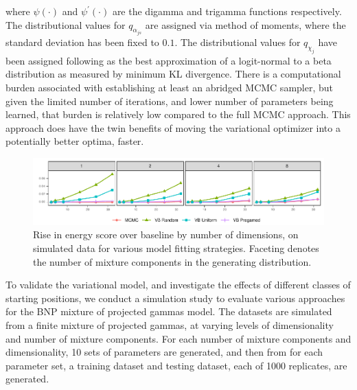     where $\psi(\cdot)$ and $\psi^{\prime}(\cdot)$ are the digamma and trigamma functions
    respectively.  The distributional values for $q_{\alpha_{js}}$ are assigned via method
    of moments, where the standard deviation has been fixed to $0.1$.  The distributional
    values for $q_{\chi_j}$ have been assigned following \cite{aitchison1980} as the best
    approximation of a logit-normal to a beta distribution as measured by minimum KL 
    divergence.  There is a computational burden associated with establishing at least an
    abridged MCMC sampler, but given the limited number of iterations, and lower number of
    parameters being learned, that burden is relatively low compared to the full MCMC approach.
    This approach does have the twin benefits of moving the variational optimizer into a 
    potentially better optima, faster.

\begin{figure}[htb]
    \caption{Rise in energy score over baseline by number of dimensions, on simulated data 
    for various model fitting strategies. Faceting denotes the number of mixture components 
    in the generating distribution. \label{fig:energyscore}}
    \includegraphics[width=\linewidth]{plots/energy_score}
\end{figure}

To validate the variational model, and investigate the effects of different classes of 
    starting positions, we conduct a simulation study to evaluate various approaches for
    the BNP mixture of projected gammas model.  The datasets are simulated from a finite
    mixture of projected gammas, at varying levels of dimensionality and number of mixture
    components.  For each number of mixture components and dimensionality, 10 sets of
    parameters are generated, and then from for each parameter set, a training dataset and 
    testing dataset, each of \num{1000} replicates, are generated.

